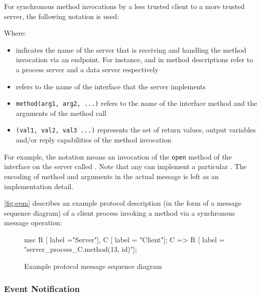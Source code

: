 For synchronous method invocations by a less trusted client to a more trusted server, the following notation is used:

\begin{center}
\end{center}

Where:

\begin{itemize} 
	\item
	 indicates the name of the server that is receiving and	handling the method invocation via an endpoint. For instance,  and  in method descriptions refer to a process server and a data server respectively
	
	\item
	 refers to the name of the interface that the server
	implements

	\item
	\texttt{method(arg1, arg2, ...)} refers to the name of the interface method and	the arguments of the method call

	\item
	\texttt{(val1, val2, val3 ...)} represents the set of return values, output variables and/or reply capabilities of the method invocation
\end{itemize}

For example, the notation  means an invocation of the \texttt{open} method of the  interface on the server called . Note that any  can implement a particular . The encoding of method and arguments in the actual message is left as an implementation detail.

\autoref{fig:epm} describes an example protocol description (in the form of a message sequence diagram) of a client process invoking a method via a synchronous message operation:

\begin{figure}[htb]
  \centering
  \begin{msc}
    msc {
      R [ label ="Server"],
      C [ label = "Client"];
      C => R [ label = "server\_process\_C.method(13, id)"];
    }
  \end{msc}
  \caption{Example protocol message sequence diagram}
  \label{fig:epm}
\end{figure}

\subsubsection*{Event Notification}

